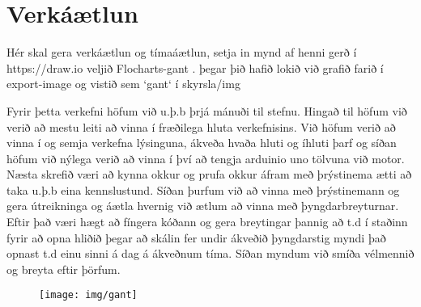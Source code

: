 \section{Verkáætlun}
Hér skal gera verkáætlun og tímaáætlun, setja in mynd af henni gerð í https://draw.io veljið Flocharts-gant .  þegar þið hafið lokið við grafið farið í export-image og vistið sem `gant` í skyrsla/img

Fyrir þetta verkefni höfum við u.þ.b þrjá mánuði til stefnu. Hingað til höfum við verið að mestu leiti að vinna í fræðilega hluta verkefnisins.  Við höfum verið að vinna í og semja verkefna lýsinguna, ákveða hvaða hluti og íhluti þarf og síðan höfum við nýlega verið að vinna í því að tengja arduinio uno tölvuna við motor.  Næsta skrefið væri að kynna okkur og prufa okkur áfram með þrýstinema ætti að taka u.þ.b eina kennslustund. Síðan þurfum við að vinna með þrýstinemann og gera útreikninga og áætla hvernig við ætlum að vinna með þyngdarbreyturnar. Eftir það væri hægt að fíngera kóðann og gera breytingar þannig að t.d í staðinn fyrir að opna hliðið þegar að skálin fer undir ákveðið þyngdarstig myndi það opnast t.d einu sinni á dag á ákveðnum tíma. Síðan myndum við smíða vélmennið og breyta eftir þörfum.
\begin{figure}[h]
\texttt{[image: img/gant]}
\end{figure}